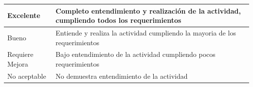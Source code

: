 \documentclass[12pt]{article}
\begin{document}
\begin{table}[ht!]
\begin{center}
\begin{tabular}{|m{}|m{}|m{}|m{}|m{}|}
        Excelente       & \multicolumn{4}{m{0.48\textwidth}|}{Completo entendimiento y realizaci\'on de la actividad, cumpliendo todos los requerimientos} \\ \hline
        Bueno           & \multicolumn{4}{m{0.48\textwidth}|}{Entiende y realiza la actividad cumpliendo la mayoria de los requerimientos} \\ \hline
        Requiere Mejora & \multicolumn{4}{m{0.48\textwidth}|}{Bajo entendimiento de la actividad cumpliendo pocos requerimientos} \\ \hline
        No aceptable    & \multicolumn{4}{m{0.48\textwidth}|}{No demuestra entendimiento de la actividad} \\ \hline

    \end{tabular}
    \end{center}
\end{table}
\end{document}
